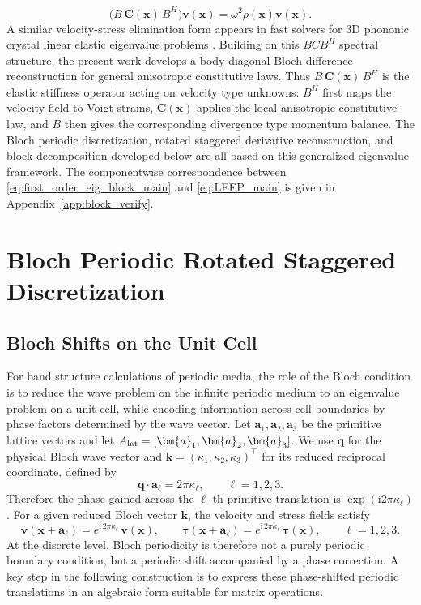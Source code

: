 \documentclass[11pt,oneside]{article}
\numberwithin{equation}{section}
\theoremstyle{plain}
\theoremstyle{remark}
\newcommand{\bk}{\bm{k}}
\newcommand{\bq}{\bm{q}}
\newcommand{\ba}[1]{\bm{a}_{#1}}
\begin{document}
\begin{equation}\label{eq:LEEP_main}
\bigl(B\,\bm C(\mathbf x)\,B^H\bigr)\bm v(\mathbf x)
=
\omega^2\rho(\mathbf x)\bm v(\mathbf x).
\end{equation}
A similar velocity-stress elimination form appears in fast solvers for 3D phononic crystal linear elastic eigenvalue problems \cite{LyuTianLiLin2024JSC}. Building on this \(BCB^H\) spectral structure, the present work develops a body-diagonal Bloch difference reconstruction for general anisotropic constitutive laws. Thus \(B\,\bm C(\mathbf x)\,B^H\) is the elastic stiffness operator acting on velocity type unknowns: \(B^H\) first maps the velocity field to Voigt strains, \(\bm C(\mathbf x)\) applies the local anisotropic constitutive law, and \(B\) then gives the corresponding divergence type momentum balance. The Bloch periodic discretization, rotated staggered derivative reconstruction, and block decomposition developed below are all based on this generalized eigenvalue framework. The componentwise correspondence between \eqref{eq:first_order_eig_block_main} and \eqref{eq:LEEP_main} is given in Appendix~\ref{app:block_verify}.

\section{Bloch Periodic Rotated Staggered Discretization}
\label{sec:blochdisc}

\subsection{Bloch Shifts on the Unit Cell}

For band structure calculations of periodic media, the role of the Bloch condition is to reduce the wave problem on the infinite periodic medium to an eigenvalue problem on a unit cell, while encoding information across cell boundaries by phase factors determined by the wave vector. Let \(\ba{1},\ba{2},\ba{3}\) be the primitive lattice vectors and let \(A_{\rm lat}=[\ba{1},\ba{2},\ba{3}]\). We use \(\bq\) for the physical Bloch wave vector and \(\bk=(\kappa_1,\kappa_2,\kappa_3)^\top\) for its reduced reciprocal coordinate, defined by
\begin{equation}\label{eq:reduced_bloch_coordinate}
\bq\cdot\ba{\ell}=2\pi\kappa_\ell,
\qquad \ell=1,2,3.
\end{equation}
Therefore the phase gained across the \(\ell\)-th primitive translation is \(\exp(\mathrm i2\pi\kappa_\ell)\). For a given reduced Bloch vector \(\bk\), the velocity and stress fields satisfy
\begin{equation}\label{eq:bloch_main}
\bm v(\mathbf x+\ba{\ell})=e^{\mathrm i\,2\pi\kappa_\ell}\,\bm v(\mathbf x),\qquad
\widetilde{\bm\tau}(\mathbf x+\ba{\ell})=e^{\mathrm i\,2\pi\kappa_\ell}\,\widetilde{\bm\tau}(\mathbf x),
\qquad \ell=1,2,3.
\end{equation}
At the discrete level, Bloch periodicity is therefore not a purely periodic boundary condition, but a periodic shift accompanied by a phase correction. A key step in the following construction is to express these phase-shifted periodic translations in an algebraic form suitable for matrix operations.
\end{document}
